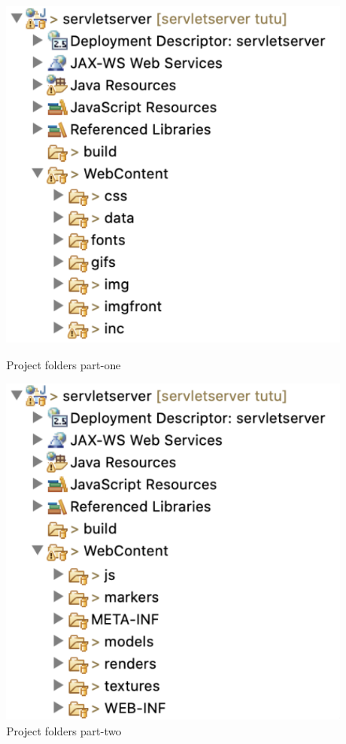\begin{figure}[!htbp]
\center
\begin{minipage}{0.495\linewidth}
\center
\captionsetup{justification=centering,margin=0cm,font=small}
\includegraphics[width=0.8\linewidth]{img/cap5/folders01}
\caption{Project folders part-one} \label{fig:folders01}
\end{minipage}
\begin{minipage}{0.495\linewidth}
\center
\captionsetup{justification=centering,margin=0cm,font=small}
\includegraphics[width=0.8\linewidth]{img/cap5/folders02}
\caption{Project folders part-two} \label{fig:folders02}
\end{minipage}
\end{figure}

